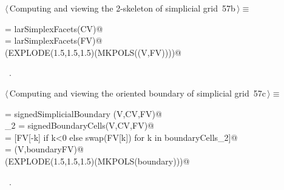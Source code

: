 \documentclass[11pt,oneside]{article}    %
\begin{document}
\begin{flushleft} \small \label{scrap106}
\protect{}$\langle\,$Computing and viewing the 2-skeleton of simplicial grid\nobreak\ {\footnotesize 57b}$\,\rangle\equiv$
\vspace{-1ex}
\begin{list}{}{} \item
\mbox{}\verb@FV = larSimplexFacets(CV)@\\
\mbox{}\verb@EV = larSimplexFacets(FV)@\\
\mbox{}\verb@VIEW(EXPLODE(1.5,1.5,1.5)(MKPOLS((V,FV))))@\\
\mbox{}\verb@@{\NWsep}
\end{list}
\vspace{-1ex}
\footnotesize\addtolength{\baselineskip}{-1ex}
\begin{list}{}{\setlength{\itemsep}{-\parsep}\setlength{\itemindent}{-\leftmargin}}
\item \NWtxtMacroRefIn\ .
\end{list}
\end{flushleft}

\begin{flushleft} \small \label{scrap107}
\protect{}$\langle\,$Computing and viewing the oriented boundary of simplicial grid\nobreak\ {\footnotesize 57c}$\,\rangle\equiv$
\vspace{-1ex}
\begin{list}{}{} \item
\mbox{}\verb@csrSignedBoundaryMat = signedSimplicialBoundary (V,CV,FV)@\\
\mbox{}\verb@boundaryCells_2 = signedBoundaryCells(V,CV,FV)@\\
\mbox{}\verb@boundaryFV = [FV[-k] if k<0 else swap(FV[k]) for k in boundaryCells_2]@\\
\mbox{}\verb@boundary = (V,boundaryFV)@\\
\mbox{}\verb@VIEW(EXPLODE(1.5,1.5,1.5)(MKPOLS(boundary)))@\\
\mbox{}\verb@@{\NWsep}
\end{list}
\vspace{-1ex}
\footnotesize\addtolength{\baselineskip}{-1ex}
\begin{list}{}{\setlength{\itemsep}{-\parsep}\setlength{\itemindent}{-\leftmargin}}
\item \NWtxtMacroRefIn\ .
\end{list}
\end{flushleft}
\end{document}
